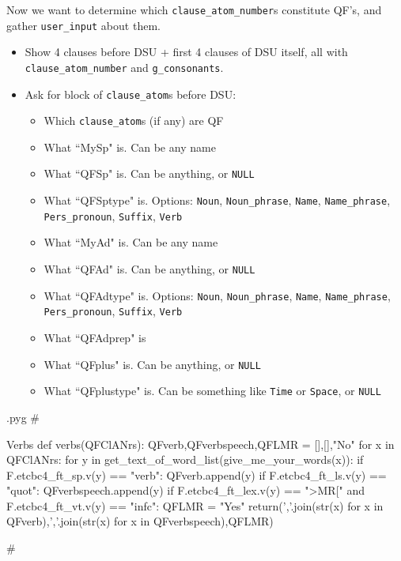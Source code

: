 \documentclass{report}
\makeatletter
\newcommand{\mi}[1]{\lstinline{#1}}
\newenvironment{python}{%
  \VerbatimEnvironment
  \minted@resetoptions
  \setkeys{minted@opt}{}
      \begin{VerbatimOut}{\jobname.pyg}}
{%
      \end{VerbatimOut}
      \minted@pygmentize{python}
      \DeleteFile{\jobname.pyg}}
\makeatother
\begin{document}
\begin{multicols}{2}
Now we want to determine which \mi{clause_atom_number}s constitute QF's, and gather \mi{user_input} about them.
\begin{itemize}
 \item Show 4 clauses before DSU + first 4 clauses of DSU itself, all with \mi{clause_atom_number} and \mi{g_consonants}.
 \item Ask for block of \mi{clause_atom}s before DSU:
 \begin{itemize}
    \item Which \mi{clause_atom}s (if any) are QF
    \item What ``MySp" is. Can be any name
    \item What ``QFSp" is. Can be anything, or \mi{NULL}
    \item What ``QFSptype" is. Options: \mi{Noun}, \mi{Noun_phrase}, \mi{Name}, \mi{Name_phrase}, \mi{Pers_pronoun}, \mi{Suffix}, \mi{Verb}
    \item What ``MyAd" is. Can be any name
    \item What ``QFAd" is. Can be anything, or \mi{NULL}
    \item What ``QFAdtype" is. Options: \mi{Noun}, \mi{Noun_phrase}, \mi{Name}, \mi{Name_phrase}, \mi{Pers_pronoun}, \mi{Suffix}, \mi{Verb}
    \item What ``QFAdprep" is
    \item What ``QFplus" is. Can be anything, or \mi{NULL}
    \item What ``QFplustype" is. Can be something like \mi{Time} or \mi{Space}, or \mi{NULL}
  \end{itemize}
\end{itemize}
\end{multicols}

\begin{python}
#{{{ Verbs
def verbs(QFClANrs):
    QFverb,QFverbspeech,QFLMR = [],[],"No"
    for x in QFClANrs:
        for y in get_text_of_word_list(give_me_your_words(x)):
            if F.etcbc4_ft_sp.v(y) == "verb":
                QFverb.append(y)
                if F.etcbc4_ft_ls.v(y) == "quot":
                    QFverbspeech.append(y)
                    if F.etcbc4_ft_lex.v(y) == ">MR[" and F.etcbc4_ft_vt.v(y) == "infc":
                        QFLMR = "Yes"
    return(','.join(str(x) for x in QFverb),','.join(str(x) for x in QFverbspeech),QFLMR)

#}}}
\end{python}
\end{document}
